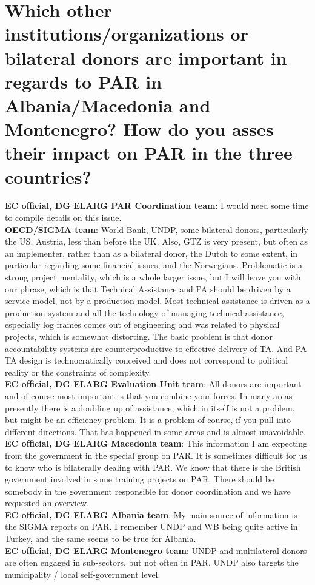 \section{Which other institutions/organizations or bilateral donors are important in regards to PAR in Albania/Macedonia and Montenegro? How do you asses their impact on PAR in the three countries?}
\label{sec:countries2}
\textbf{EC official, DG ELARG PAR Coordination team}: I would need some time to compile details on this issue. \\
\textbf{OECD/SIGMA team}: World Bank, UNDP, some bilateral donors, particularly the US, Austria, less than before the UK. Also, GTZ is very present, but often as an implementer, rather than as a bilateral donor, the Dutch to some extent, in particular regarding some financial issues, and the Norwegians. Problematic is a strong project mentality, which is a whole larger issue, but I will leave you with our phrase, which is that Technical Assistance and PA should be driven by a service model, not by a production model. Most technical assistance is driven as a production system and all the technology of managing technical assistance, especially log frames comes out of engineering and was related to physical projects, which is somewhat distorting. The basic problem is that donor accountability systems are counterproductive to effective delivery of TA. And PA TA design is technocratically conceived and does not correspond to political reality or the constraints of complexity.\\
\textbf{EC official, DG ELARG Evaluation Unit team}: All donors are important and of course most important is that you combine your forces. In many areas presently there is a doubling up of assistance, which in itself is not a problem, but might be an efficiency problem. It is a problem of course, if you pull into different directions. That has happened in some areas and is almost unavoidable. \\
\textbf{EC official, DG ELARG Macedonia team}: This information I am expecting from the government in the special group on PAR. It is sometimes difficult for us to know who is bilaterally dealing with PAR. We know that there is the British government involved in some training projects on PAR. There should be somebody in the government responsible for donor coordination and we have requested an overview. \\
\textbf{EC official, DG ELARG Albania team}: My main source of information is the SIGMA reports on PAR. I remember UNDP and WB being quite active in Turkey, and the same seems to be true for Albania.\\
\textbf{EC official, DG ELARG Montenegro team}: UNDP and multilateral donors are often engaged in sub-sectors, but not often in PAR. UNDP also targets the municipality / local self-government level.\\
